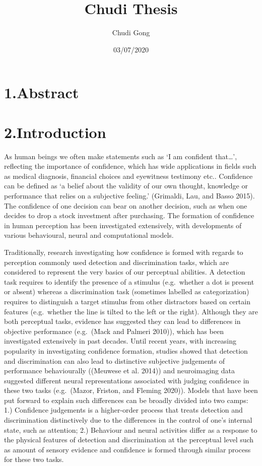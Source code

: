 \documentclass[
]{article}
\title{Chudi Thesis}
\author{Chudi Gong}
\date{03/07/2020}
\begin{document}
\maketitle

\hypertarget{abstract}{%
\section{1.Abstract}\label{abstract}}

\hypertarget{introduction}{%
\section{2.Introduction}\label{introduction}}

As human beings we often make statements such as `I am confident
that\ldots{}', reflecting the importance of confidence, which has wide
applications in fields such as medical diagnosis, financial choices and
eyewitness testimony etc.. Confidence can be defined as `a belief about
the validity of our own thought, knowledge or performance that relies on
a subjective feeling.' (Grimaldi, Lau, and Basso 2015). The confidence
of one decision can bear on another decision, such as when one decides
to drop a stock investment after purchasing. The formation of confidence
in human perception has been investigated extensively, with developments
of various behavioural, neural and computational models.

Traditionally, research investigating how confidence is formed with
regards to perception commonly used detection and discrimination tasks,
which are considered to represent the very basics of our perceptual
abilities. A detection task requires to identify the presence of a
stimulus (e.g.~whether a dot is present or absent) whereas a
discrimination task (sometimes labelled as categorization) requires to
distinguish a target stimulus from other distractors based on certain
features (e.g.~whether the line is tilted to the left or the right).
Although they are both perceptual tasks, evidence has suggested they can
lead to differences in objective performance (e.g.~(Mack and Palmeri
2010)), which has been investigated extensively in past decades. Until
recent years, with increasing popularity in investigating confidence
formation, studies showed that detection and discrimination can also
lead to distinctive subjective judgements of performance behaviourally
((Meuwese et al. 2014)) and neuroimaging data suggested different neural
representations associated with judging confidence in these two tasks
(e.g.~(Mazor, Friston, and Fleming 2020)). Models that have been put
forward to explain such differences can be broadly divided into two
camps: 1.) Confidence judgements is a higher-order process that treats
detection and discrimination distinctively due to the differences in the
control of one's internal state, such as attention; 2.) Behaviour and
neural activities differ as a response to the physical features of
detection and discrimination at the perceptual level such as amount of
sensory evidence and confidence is formed through similar process for
these two tasks.
\end{document}

